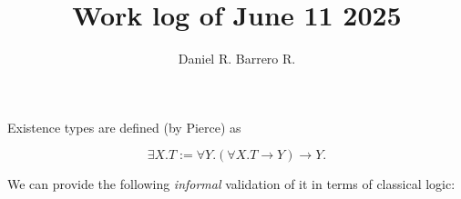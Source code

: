 \documentclass{amsart}
\title{Work log of June 11 2025}
\author{Daniel R. Barrero R.}
\begin{document}
\maketitle

Existence types are defined (by Pierce) as  

$$
\exists X . T := \forall Y . (\forall X . T \to Y) \to Y.
$$

We can provide the following \emph{informal} validation of it in
terms of classical logic:
\end{document}
